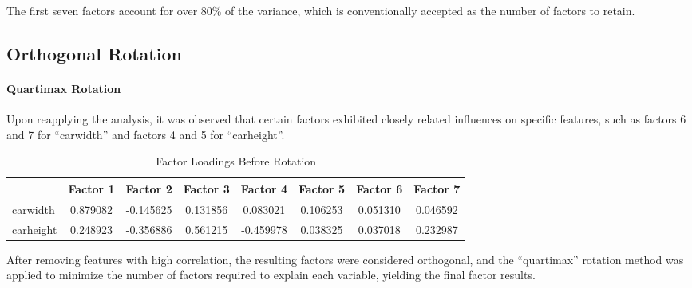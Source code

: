 \documentclass{article}
\begin{document}
The first seven factors account for over 80\% of the variance, which is conventionally accepted as the number of factors to retain.

\subsection{Orthogonal Rotation}
\paragraph{Quartimax Rotation} Upon reapplying the analysis, it was observed that certain factors exhibited closely related influences on specific features, such as factors 6 and 7 for ``carwidth'' and factors 4 and 5 for ``carheight''.

\begin{table}[H]
    \centering
    \caption{Factor Loadings Before Rotation}
    \begin{tabular}{lccccccc}
        \toprule
                  & \textbf{Factor 1} & \textbf{Factor 2} & \textbf{Factor 3} & \textbf{Factor 4} & \textbf{Factor 5} & \textbf{Factor 6} & \textbf{Factor 7} \\
        \midrule
        carwidth  & 0.879082          & -0.145625         & 0.131856          & 0.083021          & 0.106253          & 0.051310          & 0.046592          \\
        carheight & 0.248923          & -0.356886         & 0.561215          & -0.459978         & 0.038325          & 0.037018          & 0.232987          \\
        \bottomrule
    \end{tabular}
\end{table}

After removing features with high correlation, the resulting factors were considered orthogonal, and the ``quartimax'' rotation method was applied to minimize the number of factors required to explain each variable, yielding the final factor results.
\end{document}
